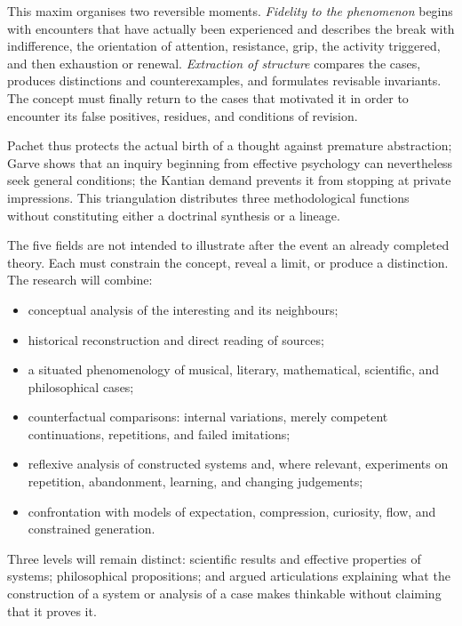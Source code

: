 \documentclass[11pt,a4paper]{article}
\begin{document}
This maxim organises two reversible moments. \emph{Fidelity to the phenomenon}
begins with encounters that have actually been experienced and describes the
break with indifference, the orientation of attention, resistance, grip, the
activity triggered, and then exhaustion or renewal. \emph{Extraction of
structure} compares the cases, produces distinctions and counterexamples, and
formulates revisable invariants. The concept must finally return to the cases
that motivated it in order to encounter its false positives, residues, and
conditions of revision.

Pachet thus protects the actual birth of a thought against premature
abstraction; Garve shows that an inquiry beginning from effective psychology can
nevertheless seek general conditions; the Kantian demand prevents it from
stopping at private impressions. This triangulation distributes three
methodological functions without constituting either a doctrinal synthesis or a
lineage.

The five fields are not intended to illustrate after the event an already
completed theory. Each must constrain the concept, reveal a limit, or produce a
distinction. The research will combine:

\begin{itemize}
  \item conceptual analysis of the interesting and its neighbours;
  \item historical reconstruction and direct reading of sources;
  \item a situated phenomenology of musical, literary, mathematical,
        scientific, and philosophical cases;
  \item counterfactual comparisons: internal variations, merely competent
        continuations, repetitions, and failed imitations;
  \item reflexive analysis of constructed systems and, where relevant,
        experiments on repetition, abandonment, learning, and changing
        judgements;
  \item confrontation with models of expectation, compression, curiosity,
        flow, and constrained generation.
\end{itemize}

Three levels will remain distinct: scientific results and effective properties
of systems; philosophical propositions; and argued articulations explaining
what the construction of a system or analysis of a case makes thinkable without
claiming that it proves it.
\end{document}
